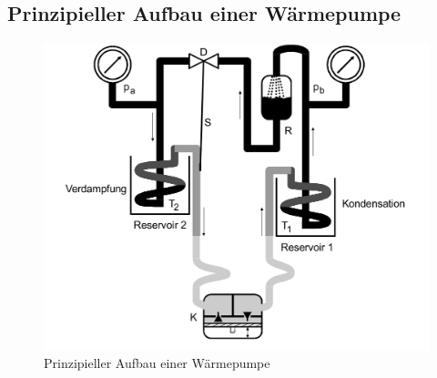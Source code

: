 \subsection{Prinzipieller Aufbau einer Wärmepumpe}
\label{sec:Versuchsaufbau}


\begin{figure}
  \centering
  \includegraphics[width=\textwidth]{content/aufbau_waermepumpe.png}
  \caption{Prinzipieller Aufbau einer Wärmepumpe \cite{Anleitung}}
  \label{fig:bild1}
\end{figure}
